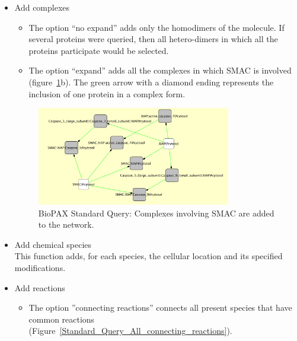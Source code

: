 \begin{itemize}
\item Add complexes
\begin{itemize}
\item The option “no expand” adds only the homodimers of the molecule. If several proteins were queried,
then all hetero-dimers in which all the proteins participate would be selected.
\item The option “expand” adds all the complexes in which SMAC is involved
(figure~\ref{Standard_Query_Add_complexes}b). The green arrow with a diamond
ending represents the inclusion of one protein in a complex form.
\end{itemize}

\begin{figure}
\centering
\includegraphics[width=0.8\textwidth]{graphics/ebo_smac_prot_complex}
\caption{BioPAX Standard Query: Complexes involving SMAC are added to the network.}
\label{Standard_Query_Add_complexes}
\end{figure}

\item Add chemical species\\
This function adds, for each species, the cellular location and its specified modifications.


\item Add reactions
\begin{itemize}
\item The option ''connecting reactions'' connects all present species that have common reactions (Figure~\ref{Standard_Query_All_connecting_reactions}).


\end{itemize}
\end{itemize}
